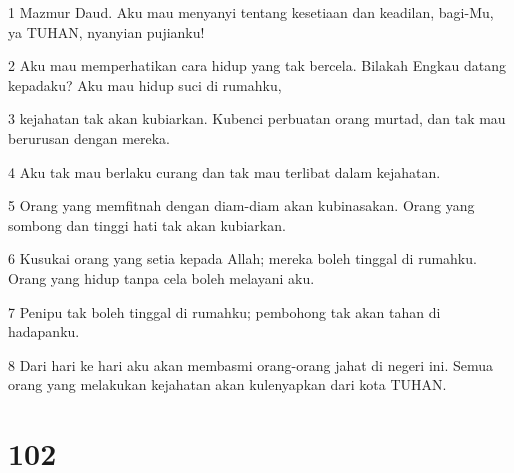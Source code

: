 \par 1 Mazmur Daud. Aku mau menyanyi tentang kesetiaan dan keadilan, bagi-Mu, ya TUHAN, nyanyian pujianku!
\par 2 Aku mau memperhatikan cara hidup yang tak bercela. Bilakah Engkau datang kepadaku? Aku mau hidup suci di rumahku,
\par 3 kejahatan tak akan kubiarkan. Kubenci perbuatan orang murtad, dan tak mau berurusan dengan mereka.
\par 4 Aku tak mau berlaku curang dan tak mau terlibat dalam kejahatan.
\par 5 Orang yang memfitnah dengan diam-diam akan kubinasakan. Orang yang sombong dan tinggi hati tak akan kubiarkan.
\par 6 Kusukai orang yang setia kepada Allah; mereka boleh tinggal di rumahku. Orang yang hidup tanpa cela boleh melayani aku.
\par 7 Penipu tak boleh tinggal di rumahku; pembohong tak akan tahan di hadapanku.
\par 8 Dari hari ke hari aku akan membasmi orang-orang jahat di negeri ini. Semua orang yang melakukan kejahatan akan kulenyapkan dari kota TUHAN.

\chapter{102}

